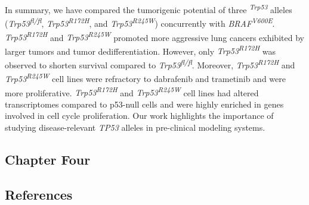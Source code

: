 In summary, we have compared the tumorigenic potential of three \emph{\textsuperscript{Trp53}} alleles (\emph{Trp53\textsuperscript{fl/fl}}, \emph{Trp53\textsuperscript{R172H}}, and \emph{Trp53\textsuperscript{R245W}}) concurrently with \emph{BRAF\textsuperscript{V600E}}. \emph{Trp53\textsuperscript{R172H}} and \emph{Trp53\textsuperscript{R245W}} promoted more aggressive lung cancers exhibited by larger tumors and tumor dedifferentiation. However, only \emph{Trp53\textsuperscript{R172H}} was observed to shorten survival compared to \emph{Trp53\textsuperscript{fl/fl}}. Moreover, \emph{Trp53\textsuperscript{R172H}} and \emph{Trp53\textsuperscript{R245W}} cell lines were refractory to dabrafenib and trametinib and were more proliferative. \emph{Trp53\textsuperscript{R172H}} and \emph{Trp53\textsuperscript{R245W}} cell lines had altered transcriptomes compared to p53-null cells and were highly enriched in genes involved in cell cycle proliferation. Our work highlights the importance of studying disease-relevant \emph{TP53} alleles in pre-clinical modeling systems.

\hypertarget{chapter-four}{%
\subsection{Chapter Four}\label{chapter-four}}

\hypertarget{references}{%
\subsection{References}\label{references}}

